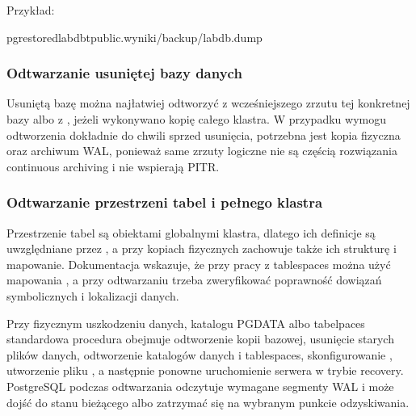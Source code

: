\documentclass[letterpaper,10pt,polish]{sphinxmanual}
\begin{document}
\sphinxAtStartPar
Przykład:

\begin{sphinxVerbatim}[commandchars=\\\{\}]
pg\PYGZus{}restore\PYGZhy{}dlabdb\PYGZhy{}tpublic.wyniki/backup/labdb.dump
\end{sphinxVerbatim}


\subsubsection{Odtwarzanie usuniętej bazy danych}
\label{\detokenize{rozdzia_u0142_2/rozdzia_u0142_28/index:odtwarzanie-usunietej-bazy-danych}}
\sphinxAtStartPar
Usuniętą bazę można najłatwiej odtworzyć z wcześniejszego zrzutu  tej konkretnej bazy albo z , jeżeli wykonywano kopię całego klastra. W przypadku wymogu odtworzenia dokładnie do chwili sprzed usunięcia, potrzebna jest kopia fizyczna oraz archiwum WAL, ponieważ same zrzuty logiczne nie są częścią rozwiązania continuous archiving i nie wspierają PITR.


\subsubsection{Odtwarzanie przestrzeni tabel i pełnego klastra}
\label{\detokenize{rozdzia_u0142_2/rozdzia_u0142_28/index:odtwarzanie-przestrzeni-tabel-i-pelnego-klastra}}
\sphinxAtStartPar
Przestrzenie tabel są obiektami globalnymi klastra, dlatego ich definicje są uwzględniane przez , a przy kopiach fizycznych  zachowuje także ich strukturę i mapowanie. Dokumentacja  wskazuje, że przy pracy z tablespaces można użyć mapowania , a przy odtwarzaniu trzeba zweryfikować poprawność dowiązań symbolicznych i lokalizacji danych.

\sphinxAtStartPar
Przy fizycznym uszkodzeniu danych, katalogu PGDATA albo tabelpaces standardowa procedura obejmuje odtworzenie kopii bazowej, usunięcie starych plików danych, odtworzenie katalogów danych i tablespaces, skonfigurowanie , utworzenie pliku , a następnie ponowne uruchomienie serwera w trybie recovery. PostgreSQL podczas odtwarzania odczytuje wymagane segmenty WAL i może dojść do stanu bieżącego albo zatrzymać się na wybranym punkcie odzyskiwania.
\end{document}
